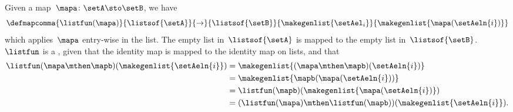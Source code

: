 Given a map~$\mapa\colon \setA \sto \setB$, we have
\begin{equation}\label{eq:list-functor-on-morphisms}
    \defmapcomma{
        \listfun(\mapa)
    }{
        \listsof{\setA}
    }{
        \to
    }{
        \listsof{\setB}
    }{
        \makegenlist{ \setAel_i }
    }{
        \makegenlist{  \mapa(\setAeln{i}) }
    }
\end{equation}
which applies~$\mapa$ entry-wise in the list.
The empty list in~$\listsof{\setA}$ is mapped to the empty list in~$\listsof{\setB}$.
    {}
$\listfun$ is a , given that the identity map is mapped to the identity map on lists, and that
\begin{equation}\label{eq:list-functor-compositionality}
    \begin{aligned}
         \listfun(\mapa \mthen \mapb)(\makegenlist{\setAeln{i}}) & =\makegenlist{ (\mapa \mthen \mapb)(\setAeln{i})} \\
         & =\makegenlist{  \mapb ( \mapa (\setAeln{i}))} \\
         & =\listfun(\mapb)(\makegenlist{\mapa(\setAeln{i})}) \\
         & =(\listfun(\mapa)\mthen \listfun(\mapb))(\makegenlist{\setAeln{i}}).
    \end{aligned}
\end{equation}

